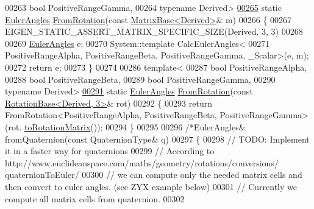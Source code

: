 \begin{DoxyCode}
00263         \textcolor{keywordtype}{bool} PositiveRangeGamma,
00264         \textcolor{keyword}{typename} Derived>
\hyperlink{class_eigen_1_1_euler_angles_accbaa67f736f1883641f70994ffc7284}{00265}       \textcolor{keyword}{static} \hyperlink{class_eigen_1_1_euler_angles}{EulerAngles} \hyperlink{class_eigen_1_1_euler_angles_accbaa67f736f1883641f70994ffc7284}{FromRotation}(\textcolor{keyword}{const} 
      \hyperlink{group___core___module_class_eigen_1_1_matrix_base}{MatrixBase<Derived>}& m)
00266       \{
00267         EIGEN\_STATIC\_ASSERT\_MATRIX\_SPECIFIC\_SIZE(Derived, 3, 3)
00268         
00269         \hyperlink{class_eigen_1_1_euler_angles}{EulerAngles} e;
00270         System::template CalcEulerAngles<
00271           PositiveRangeAlpha, PositiveRangeBeta, PositiveRangeGamma, \_Scalar>(e, m);
00272         \textcolor{keywordflow}{return} e;
00273       \}
00274       
00286       \textcolor{keyword}{template}<
00287         \textcolor{keywordtype}{bool} PositiveRangeAlpha,
00288         \textcolor{keywordtype}{bool} PositiveRangeBeta,
00289         \textcolor{keywordtype}{bool} PositiveRangeGamma,
00290         \textcolor{keyword}{typename} Derived>
\hyperlink{class_eigen_1_1_euler_angles_aec5a08ed94b3574402d99850d766d18a}{00291}       \textcolor{keyword}{static} \hyperlink{class_eigen_1_1_euler_angles}{EulerAngles} \hyperlink{class_eigen_1_1_euler_angles_aec5a08ed94b3574402d99850d766d18a}{FromRotation}(\textcolor{keyword}{const} 
      \hyperlink{class_eigen_1_1_rotation_base}{RotationBase<Derived, 3>}& rot)
00292       \{
00293         \textcolor{keywordflow}{return} FromRotation<PositiveRangeAlpha, PositiveRangeBeta, PositiveRangeGamma>(rot.
      \hyperlink{class_eigen_1_1_rotation_base_aac726e89402a427c605514ce31b01e42}{toRotationMatrix}());
00294       \}
00295       
00296       \textcolor{comment}{/*EulerAngles& fromQuaternion(const QuaternionType& q)}
00297 \textcolor{comment}{      \{}
00298 \textcolor{comment}{        // TODO: Implement it in a faster way for quaternions}
00299 \textcolor{comment}{        // According to http://www.euclideanspace.com/maths/geometry/rotations/conversions/
      quaternionToEuler/}
00300 \textcolor{comment}{        //  we can compute only the needed matrix cells and then convert to euler angles. (see ZYX example
       below)}
00301 \textcolor{comment}{        // Currently we compute all matrix cells from quaternion.}
00302 \textcolor{comment}{}

\end{DoxyCode}
